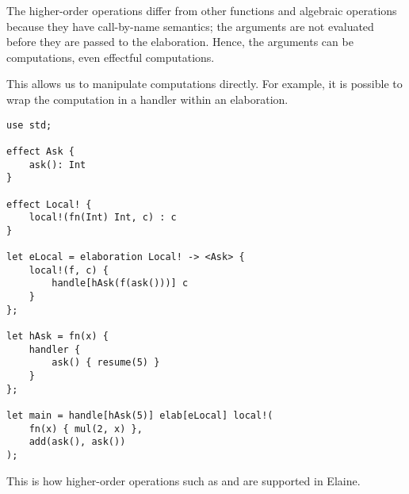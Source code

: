 The higher-order operations differ from other functions and algebraic operations because they have call-by-name semantics; the arguments are not evaluated before they are passed to the elaboration. Hence, the arguments can be computations, even effectful computations.

This allows us to manipulate computations directly. For example, it is possible to wrap the computation in a handler within an elaboration.

\begin{lstlisting}[language=elaine,style=fancy,float=htbp,caption={Reader effect with higher-order \olocal operation in Elaine.}]
use std;

effect Ask {
    ask(): Int
}

effect Local! {
    local!(fn(Int) Int, c) : c
}

let eLocal = elaboration Local! -> <Ask> {
    local!(f, c) {
        handle[hAsk(f(ask()))] c
    }
};

let hAsk = fn(x) {
    handler {
        ask() { resume(5) }
    }
};

let main = handle[hAsk(5)] elab[eLocal] local!(
    fn(x) { mul(2, x) },
    add(ask(), ask())
);
\end{lstlisting}

This is how higher-order operations such as  and  are supported in Elaine.

